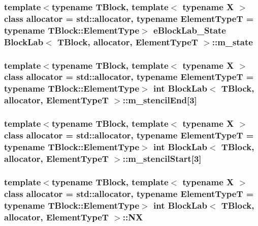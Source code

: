\subsubsection[{m\+\_\+state}]{\setlength{\rightskip}{0pt plus 5cm}template$<$typename T\+Block, template$<$ typename X $>$ class allocator = std\+::allocator, typename Element\+Type\+T = typename T\+Block\+::\+Element\+Type$>$ {\bf e\+Block\+Lab\+\_\+\+State} {\bf Block\+Lab}$<$ T\+Block, allocator, Element\+Type\+T $>$\+::m\+\_\+state\hspace{0.3cm}{\ttfamily [protected]}}\label{class_block_lab_a0e11603d73ab4923e1d9033edccdb572}
\hypertarget{class_block_lab_a46fee08b49b11be489c71f726e258cc9}{}
\subsubsection[{m\+\_\+stencil\+End}]{\setlength{\rightskip}{0pt plus 5cm}template$<$typename T\+Block, template$<$ typename X $>$ class allocator = std\+::allocator, typename Element\+Type\+T = typename T\+Block\+::\+Element\+Type$>$ int {\bf Block\+Lab}$<$ T\+Block, allocator, Element\+Type\+T $>$\+::m\+\_\+stencil\+End\mbox{[}3\mbox{]}\hspace{0.3cm}{\ttfamily [protected]}}\label{class_block_lab_a46fee08b49b11be489c71f726e258cc9}
\hypertarget{class_block_lab_a8ac6690f98ba84346a74b5b95c3afb2b}{}
\subsubsection[{m\+\_\+stencil\+Start}]{\setlength{\rightskip}{0pt plus 5cm}template$<$typename T\+Block, template$<$ typename X $>$ class allocator = std\+::allocator, typename Element\+Type\+T = typename T\+Block\+::\+Element\+Type$>$ int {\bf Block\+Lab}$<$ T\+Block, allocator, Element\+Type\+T $>$\+::m\+\_\+stencil\+Start\mbox{[}3\mbox{]}\hspace{0.3cm}{\ttfamily [protected]}}\label{class_block_lab_a8ac6690f98ba84346a74b5b95c3afb2b}
\hypertarget{class_block_lab_abcd7367c6f45124d3202c8da5043ac93}{}
\subsubsection[{N\+X}]{\setlength{\rightskip}{0pt plus 5cm}template$<$typename T\+Block, template$<$ typename X $>$ class allocator = std\+::allocator, typename Element\+Type\+T = typename T\+Block\+::\+Element\+Type$>$ int {\bf Block\+Lab}$<$ T\+Block, allocator, Element\+Type\+T $>$\+::N\+X\hspace{0.3cm}{\ttfamily [protected]}}\label{class_block_lab_abcd7367c6f45124d3202c8da5043ac93}
\hypertarget{class_block_lab_aaa1e748664ebb6b4fc7c47cf30a445db}{}
